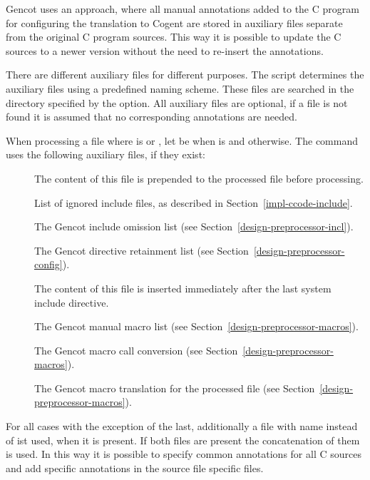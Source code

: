 Gencot uses an approach, where all manual annotations added to the C program for configuring the translation to Cogent 
are stored in auxiliary files separate from the original C program sources. This way it is possible to update the C 
sources to a newer version without the need to re-insert the annotations.

There are different auxiliary files for different purposes. The  script determines the auxiliary files using
a predefined naming scheme. These files are searched in the directory specified by the  option. All auxiliary files
are optional, if a file is not found it is assumed that no corresponding annotations are needed.

When processing a file  where  is  or , let  be  when 
is  and  otherwise. The  command uses the following auxiliary files, if they exist:
\begin{description}
\item[] The content of this file is prepended to the processed file before processing.
\item[] List of ignored include files, as described in Section~\ref{impl-ccode-include}.
\item[] The Gencot include omission list (see Section~\ref{design-preprocessor-incl}).
\item[] The Gencot directive retainment list (see Section~\ref{design-preprocessor-config}).
\item[] The content of this file is inserted immediately after the last system include directive.
\item[] The Gencot manual macro list (see Section~\ref{design-preprocessor-macros}).
\item[] The Gencot macro call conversion (see Section~\ref{design-preprocessor-macros}).
\item[] The Gencot macro translation for the processed file (see Section~\ref{design-preprocessor-macros}).
\end{description}

For all cases with the exception of the last, additionally a file with name  instead of  ist used, when it
is present. If both files are present the concatenation of them is used. In this way it is possible to specify common annotations 
for all C sources and add specific annotations in the source file specific files.

